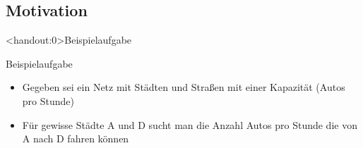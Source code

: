   \subsection{Motivation}
  \begin{frame}<handout:0>{Beispielaufgabe}
    \begin{block}{Beispielaufgabe}
      \begin{itemize}
        \item Gegeben sei ein Netz mit Städten und Straßen mit einer Kapazität (Autos pro Stunde)
        \pause
        \item Für gewisse Städte A und D sucht man die Anzahl Autos pro Stunde die von A nach D fahren können
      \end{itemize}
    \end{block}
  \end{frame}
